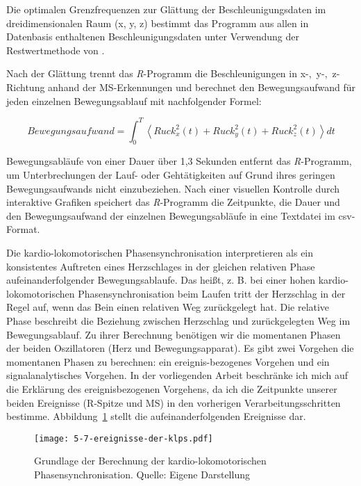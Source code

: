 Die optimalen Grenzfrequenzen zur Glättung der Beschleunigungsdaten im dreidimensionalen Raum (x, y, z) bestimmt das Programm aus allen in Datenbasis enthaltenen Beschleunigungsdaten unter Verwendung der Restwertmethode von \citet{Wells1980}.

Nach der Glättung trennt das \emph{R}-Programm die Beschleunigungen in \mbox{x-, y-, z-Richtung} anhand der MS-Erkennungen und berechnet den Bewegungsaufwand für jeden einzelnen Bewegungsablauf mit nachfolgender Formel:

\begin{equation}
	Bewegungsaufwand = \int^T_0 \left\langle {Ruck^2_{x}(t) + Ruck^2_{y}(t) + Ruck^2_{z}(t)}\right\rangle dt
\end{equation}

Bewegungsabläufe von einer Dauer über 1,3 Sekunden entfernt das \emph{R}-Programm, um Unterbrechungen der Lauf- oder Gehtätigkeiten auf Grund ihres geringen Bewegungsaufwands nicht einzubeziehen. Nach einer visuellen Kontrolle durch interaktive Grafiken speichert das \emph{R}-Programm die Zeitpunkte, die Dauer und den Bewegungsaufwand der einzelnen Bewegungsabläufe in eine Textdatei im \acs{csv}-Format.

Die kardio-lokomotorischen Phasensynchronisation interpretieren \citet[][S.~12]{Niizeki2014} als ein konsistentes Auftreten eines Herzschlages in der gleichen relativen Phase aufeinanderfolgender Bewegungsablaufe. Das heißt, z. B. bei einer hohen kardio-lokomotorischen Phasensynchronisation beim Laufen tritt der Herzschlag in der Regel auf, wenn das Bein einen relativen Weg zurückgelegt hat. Die relative Phase beschreibt die Beziehung zwischen Herzschlag und zurückgelegten Weg im Bewegungsablauf. Zu ihrer Berechnung benötigen wir die momentanen Phasen der beiden Oszillatoren (Herz und Bewegungsapparat). Es gibt zwei Vorgehen die momentanen Phasen zu berechnen: ein ereignis-bezogenes Vorgehen und ein signalanalytisches Vorgehen. In der vorliegenden Arbeit beschränke ich mich auf die Erklärung des ereignisbezogenen Vorgehens, da ich die Zeitpunkte unserer beiden Ereignisse (R-Spitze und MS) in den vorherigen Verarbeitungsschritten bestimme. Abbildung~\ref{fig:5-7-ereignisse-der-klps} stellt die aufeinanderfolgenden Ereignisse dar.

\begin{figure}[t]
	\centering
		\texttt{[image: 5-7-ereignisse-der-klps.pdf]}
	\caption[Grundlage der Berechnung der kardio-lokomotorischen Phasensynchronisation]{Grundlage der Berechnung der kardio-lokomotorischen Phasensynchronisation. Quelle: Eigene Darstellung}
	\label{fig:5-7-ereignisse-der-klps}
\end{figure}

